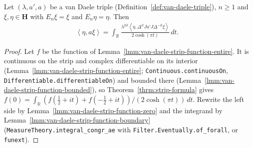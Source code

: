 \begin{proposition}
    \label{prpstn:van-daele-integral-formula-H0}
    \leanok
    Let $(\lambda, a', a)$ be a van Daele triple (Definition~\ref{def:van-daele-triple}), $n \ge 1$ and $\xi, \eta \in \mathbf{H}$ with $E_n\xi = \xi$ and $E_n\eta = \eta$. Then
    \begin{align}
        \left< \eta, a\xi \right> = \int_{\mathbb{R}} \frac{\lambda^{2it}\left< \eta, \Delta^{it}Ja'J\Delta^{-it}\xi \right>}{2\cosh(\pi t)} \, dt.
    \end{align}
\end{proposition}
\begin{proof}
    \leanok
    Let $f$ be the function of Lemma~\ref{lmm:van-daele-strip-function-entire}. It is continuous on the strip and complex differentiable on its interior (Lemma~\ref{lmm:van-daele-strip-function-entire}; \texttt{Continuous.continuousOn}, \texttt{Differentiable.differentiableOn}) and bounded there (Lemma~\ref{lmm:van-daele-strip-function-bounded}), so Theorem~\ref{thrm:strip-formula} gives $f(0) = \int_{\mathbb{R}} (f(\tfrac{1}{2} + it) + f(-\tfrac{1}{2} + it))/(2\cosh(\pi t)) \, dt$. Rewrite the left side by Lemma~\ref{lmm:van-daele-strip-function-zero} and the integrand by Lemma~\ref{lmm:van-daele-strip-function-boundary} (\texttt{MeasureTheory.integral\_congr\_ae} with \texttt{Filter.Eventually.of\_forall}, or \texttt{funext}).
\end{proof}

